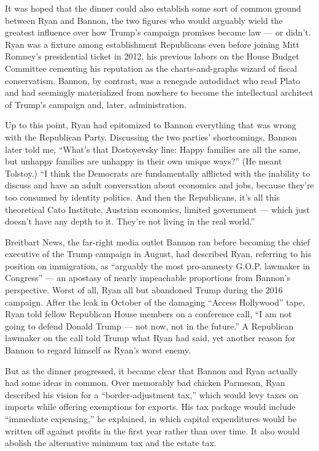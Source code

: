 It was hoped that the dinner could also establish some sort of common
ground between Ryan and Bannon, the two figures who would arguably wield
the greatest influence over how Trump's campaign promises became law ---
or didn't. Ryan was a fixture among establishment Republicans even
before joining Mitt Romney's presidential ticket in 2012, his previous
labors on the House Budget Committee cementing his reputation as the
charts-and-graphs wizard of fiscal conservatism. Bannon, by contrast,
was a renegade autodidact who read Plato and had seemingly materialized
from nowhere to become the intellectual architect of Trump's campaign
and, later, administration.

Up to this point, Ryan had epitomized to Bannon everything that was
wrong with the Republican Party. Discussing the two parties'
shortcomings, Bannon later told me, ``What's that Dostoyevsky line:
Happy families are all the same, but unhappy families are unhappy in
their own unique ways?'' (He meant Tolstoy.) ``I think the Democrats are
fundamentally afflicted with the inability to discuss and have an adult
conversation about economics and jobs, because they're too consumed by
identity politics. And then the Republicans, it's all this theoretical
Cato Institute, Austrian economics, limited government --- which just
doesn't have any depth to it. They're not living in the real world.''

Breitbart News, the far-right media outlet Bannon ran before becoming
the chief executive of the Trump campaign in August, had described Ryan,
referring to his position on immigration, as ``arguably the most
pro-amnesty G.O.P. lawmaker in Congress'' --- an apostasy of nearly
impeachable proportions from Bannon's perspective. Worst of all, Ryan
all but abandoned Trump during the 2016 campaign. After the leak in
October of the damaging ``Access Hollywood'' tape, Ryan told fellow
Republican House members on a conference call, ``I am not going to
defend Donald Trump --- not now, not in the future.'' A Republican
lawmaker on the call told Trump what Ryan had said, yet another reason
for Bannon to regard himself as Ryan's worst enemy.

But as the dinner progressed, it became clear that Bannon and Ryan
actually had some ideas in common. Over memorably bad chicken Parmesan,
Ryan described his vision for a ``border-adjustment tax,'' which would
levy taxes on imports while offering exemptions for exports. His tax
package would include ``immediate expensing,'' he explained, in which
capital expenditures would be written off against profits in the first
year rather than over time. It also would abolish the alternative
minimum tax and the estate tax.

